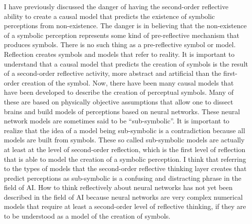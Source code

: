 I have previously discussed the danger of having the second-order
reflective ability to create a causal model that predicts the
existence of symbolic perceptions from non-existence.  The danger is
in believing that the non-existence of a symbolic perception
represents some kind of pre-reflective mechanism that produces
symbols.  There is no such thing as a pre-reflective symbol or model.
Reflection creates symbols and models that refer to reality.  It is
important to understand that a causal model that predicts the creation
of symbols is the result of a second-order reflective activity, more
abstract and artificial than the first-order creation of the symbol.
Now, there have been many causal models that have been developed to
describe the creation of perceptual symbols.  Many of these are based
on physically objective assumptions that allow one to dissect brains
and build models of perceptions based on neural networks.  These
neural network models are sometimes said to be ``sub-symbolic''.  It
is important to realize that the idea of a model being sub-symbolic is
a contradiction because all models are built from symbols.  These so
called sub-symbolic models are actually at least at the level of
second-order reflection, which is the first level of reflection that
is able to model the creation of a symbolic perception.  I think that
referring to the types of models that the second-order reflective
thinking layer creates that predict perceptions as sub-symbolic is a
confusing and distracting phrase in the field of AI.  How to think
reflectively about neural networks has not yet been described in the
field of AI because neural networks are very complex numerical models
that require at least a second-order level of reflective thinking, if
they are to be understood as a model of the creation of symbols.

